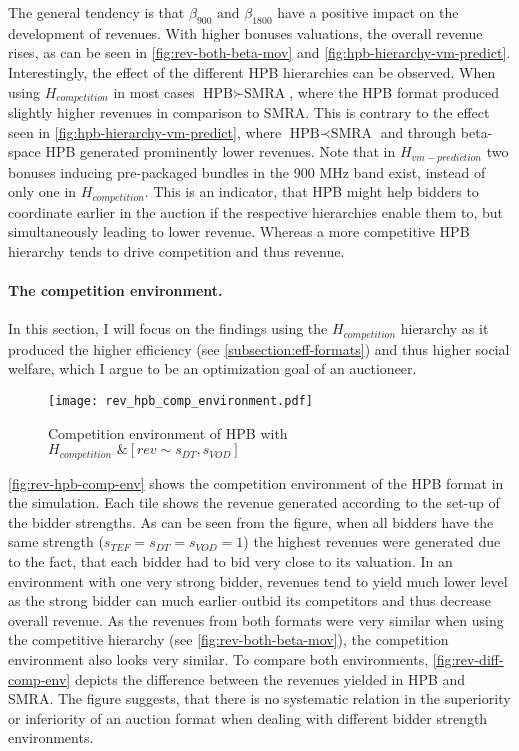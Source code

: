 The general tendency is that $ \beta_{900} \text{ and } \beta_{1800} $ have a positive impact on the development of revenues. With higher bonuses valuations, the overall revenue rises, as can be seen in \autoref{fig:rev-both-beta-mov} and \autoref{fig:hpb-hierarchy-vm-predict}. Interestingly, the effect of the different HPB hierarchies can be observed. 
When using $ H_{competition}  $ in most cases $ \text{HPB} \succ \text{SMRA} $, where the HPB format produced slightly higher revenues in comparison to SMRA. This is contrary to the effect seen in \autoref{fig:hpb-hierarchy-vm-predict}, where $ \text{HPB} \prec \text{SMRA}$ and through beta-space HPB generated prominently lower revenues. Note that in $ H_{vm-prediction} $ two bonuses inducing pre-packaged bundles in the 900 MHz band exist, instead of only one in $ H_{competition}  $. This is an indicator, that HPB might help bidders to coordinate earlier in the auction if the respective hierarchies enable them to, but simultaneously  leading to lower revenue.  Whereas a more competitive HPB hierarchy tends to drive competition and thus revenue.

\paragraph{The competition environment.}
In this section, I will focus on the findings using the  $ H_{competition}  $ hierarchy as it produced the higher efficiency (see \autoref{subsection:eff-formats}) and thus higher social welfare, which I argue to be an optimization goal of an auctioneer.

\begin{figure}[h]
	\centering
	\texttt{[image: rev\_hpb\_comp\_environment.pdf]}
	\caption{Competition environment of HPB with $ H_{competition} \text{ \& } [rev \sim s_{DT}, s_{VOD}] $} \label{fig:rev-hpb-comp-env}
\end{figure}

\autoref{fig:rev-hpb-comp-env} shows the competition environment of the HPB format in the simulation. Each tile shows the revenue generated according to the set-up of the bidder strengths. As can be seen from the figure, when all bidders have the same strength ($ s_{TEF}=s_{DT}=s_{VOD}=1 $) the highest revenues were generated due to the fact, that each bidder had to bid very close to its valuation. In an environment with one very strong bidder, revenues tend to yield much lower level as the strong bidder can much earlier outbid its competitors and thus decrease overall revenue.
As the revenues from both formats were very similar when using the competitive hierarchy (see \autoref{fig:rev-both-beta-mov}), the competition environment also looks very similar. To compare both environments, \autoref{fig:rev-diff-comp-env} depicts the difference between the revenues yielded in HPB and SMRA. The figure suggests, that there is no systematic relation in the superiority or inferiority of an auction format when dealing with different bidder strength environments.

